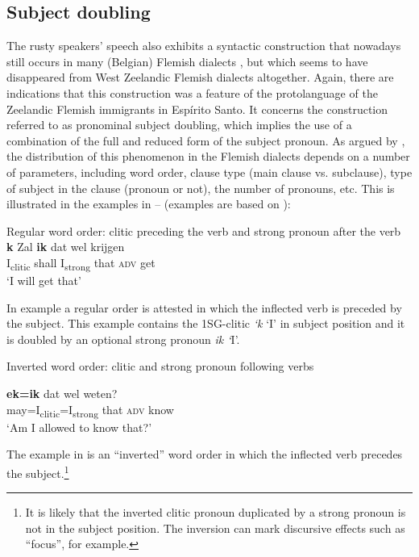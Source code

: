 \documentclass[output=paper,hidelinks,draftmode]{langscibook}
\begin{document}
\subsection{Subject doubling}
\label{subsec:52subj}
The rusty speakers’ speech also exhibits a syntactic construction that nowadays still occurs in many (Belgian) Flemish dialects \citep{Haegeman1991, VanCraenenbroeckKoppen2002, DeVogelaerDevos2008, DeVogelaer2008}, but which seems to have disappeared from West Zeelandic Flemish dialects altogether. Again, there are indications that this construction was a feature of the protolanguage of the Zeelandic Flemish immigrants in Espírito Santo. It concerns the construction referred to as pronominal subject doubling, which implies the use of a combination of the full and reduced form of the subject pronoun. As argued by \citet[249]{DeVogelaerDevos2008}, the distribution of this phenomenon in the Flemish dialects depends on a number of parameters, including word order, clause type (main clause vs. subclause), type of subject in the clause (pronoun or not), the number of pronouns, etc. This is illustrated in the examples in – (examples are based on \citealt[243--244]{DeVogelaerDevos2008}):


\ea Regular word order: clitic preceding the verb and strong pronoun after the verb \\ 
\label{ex:schaffel:10}
\textbf{k} Zal \textbf{ik} dat wel krijgen\\
I\textsubscript{clitic} shall I\textsubscript{strong} that \textsc{adv} get\\
\glt ‘I will get that’
\z
 
 
In example  a regular order is attested in which the inflected verb is preceded by the subject. This example contains the 1SG-clitic \textit{‘k} ‘I’ in subject position and it is doubled by an optional strong pronoun \textit{ik ‘}I’.


\ea Inverted word order: clitic and strong pronoun following verbs
\label{ex:schaffel:11}

\textbf{ek=ik} dat wel weten?\\
may=I\textsubscript{clitic}=I\textsubscript{strong} that \textsc{adv} know\\
\glt ‘Am I allowed to know that?’

\z


The example in  is an ``inverted'' word order in which the inflected verb precedes the subject.\footnote{It is likely that the inverted clitic pronoun duplicated by a strong pronoun is not in the subject position. The inversion can mark discursive effects such as ``focus'', for example.}
\end{document}
